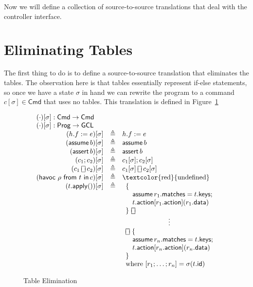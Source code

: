 \documentclass{article}
\newcommand{\Cmd}{\mathsf{Cmd}}
\newcommand{\Prog}{\mathsf{Prog}}
\newcommand{\GCL}{\mathsf{GCL}}
\newcommand{\matches}{\mathsf{matches}}
\newcommand{\action}{\mathsf{action}}
\newcommand{\keys}{\mathsf{keys}}
\newcommand{\data}{\mathsf{data}}
\newcommand{\id}{\mathsf{id}}
\newcommand{\assert}{\mathop{\mathsf{assert}}}
\newcommand{\assume}{\mathop{\mathsf{assume}}}
\newcommand{\apply}{\mathsf{apply}}
\newcommand{\choiceop}{\rotatebox[origin=c]{90}{$\sqsubset\!\!\!\sqsupset$}}
\newcommand{\choice}{\mathbin{\choiceop}}
\renewcommand{\choose}[2]{\mathop{\mathsf{havoc}~#1~\mathsf{from}~#2~\mathsf{in}}}
\begin{document}
Now we will define a collection of source-to-source translations that deal with
the controller interface.

\section{Eliminating Tables}

The first thing to do is to define a source-to-source translation that
eliminates the tables. The observation here is that tables essentially represent
if-else statements, so once we have a state $\sigma$ in hand we can rewrite the
program to a command $c[\sigma] \in \Cmd$ that uses no tables. This translation
is defined in Figure~\ref{fig:table-elim}

\begin{figure}
  \[\begin{array}{r>{\triangleq}cl}
  \multicolumn{3}{l}{(\cdot)[\sigma] : \Cmd \to \Cmd} \\
  \multicolumn{3}{l}{(\cdot)[\sigma] : \Prog \to \GCL} \\
  (h.f := e)[\sigma] && h.f := e   \\
  (\assume b)[\sigma] && \assume b \\
  (\assert b)[\sigma] && \assert b \\
  (c_1;c_2)[\sigma] && c_1[\sigma];c_2[\sigma] \\
  (c_1 \choice c_2)[\sigma] && c_1[\sigma] \choice c_2[\sigma] \\
  (\choose \rho t c)[\sigma] && \textrm{\textcolor{red}{undefined}}\\
  (t.\apply())[\sigma] &&
  \begin{array}[t]{l}
    \{\\
    \quad \assume {r_1.\matches = t.\keys};\\
    \quad t.\action[r_1.\action](r_1.\data)\\
    \}~\choice\\
    \multicolumn{1}{c}{\vdots}\\
    \choice~\{\\
    \quad \assume {r_n.\matches = t.\keys};\\
    \quad t.\action[r_n.\action](r_n.\data)\\
    \}\\
    \textrm{where}~[r_1;\ldots;r_n] = \sigma(t.\id)
  \end{array}
  \end{array}
  \]
  \caption{Table Elimination}
  \label{fig:table-elim}
\end{figure}
\end{document}

